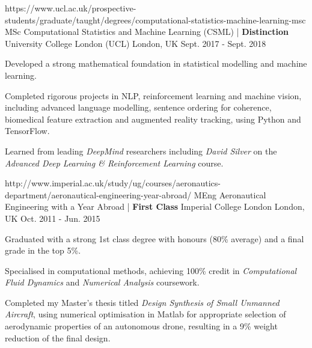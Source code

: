 

\begin{cventries}


  \cventry
    {https://www.ucl.ac.uk/prospective-students/graduate/taught/degrees/computational-statistics-machine-learning-msc}
    {MSc Computational Statistics and Machine Learning (CSML) | \textbf{Distinction}} %
    {University College London (UCL)} %
    {London, UK} %
    {Sept. 2017 - Sept. 2018} %
    {
      \begin{cvitems} %
        \item {Developed a strong mathematical foundation in statistical modelling and machine learning.}
        \item {Completed rigorous projects in NLP, reinforcement learning and machine vision, including advanced language modelling, sentence ordering for coherence, biomedical feature extraction and augmented reality tracking, using Python and TensorFlow.}
        \item {Learned from leading \emph{DeepMind} researchers including \emph{David Silver} on the \emph{Advanced Deep Learning \& Reinforcement Learning} course.}
      \end{cvitems}
    }
    
  \cventry
    {http://www.imperial.ac.uk/study/ug/courses/aeronautics-department/aeronautical-engineering-year-abroad/}
    {MEng Aeronautical Engineering with a Year Abroad | \textbf{First Class}} %
    {Imperial College London} %
    {London, UK} %
    {Oct. 2011 - Jun. 2015} %
    {
      \begin{cvitems} %
        \item {Graduated with a strong 1st class degree with honours (80\% average) and a final grade in the top 5\%.}
        \item {Specialised in computational methods, achieving 100\% credit in \emph{Computational Fluid Dynamics} and \emph{Numerical Analysis} coursework.}
        \item {Completed my Master's thesis titled \emph{Design Synthesis of Small Unmanned Aircraft}, using numerical optimisation in Matlab for appropriate selection of aerodynamic properties of an autonomous drone, resulting in a 9\% weight reduction of the final design.}
      \end{cvitems}
    }


\end{cventries}
